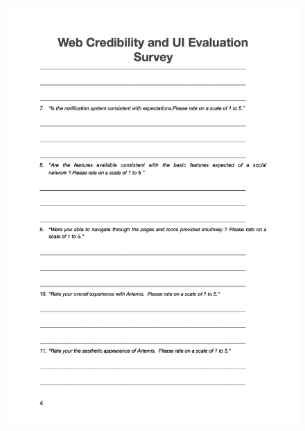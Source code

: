 \begin{figure}[H]
	\centering
	\includegraphics[scale=.7]{chapters/appendices/figures/4.png}
	\label{fig:4/6}
\end{figure}
\newpage

